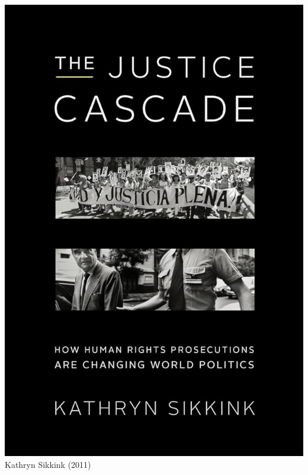 \documentclass[aspectratio=43]{beamer}
\begin{document}
\begin{frame}
\begin{minipage}{0.59\textwidth}
\end{minipage}\hfill
\begin{minipage}{0.4\textwidth}\centering
\includegraphics[width = \textwidth]{img/justice_cascade_book}\\Kathryn Sikkink (2011)
\end{minipage}

\end{frame}




\end{document}
